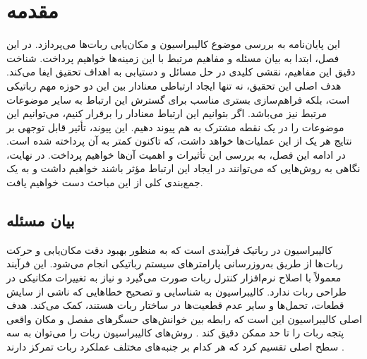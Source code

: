 
\chapter{مقدمه}

این پایان‌نامه به بررسی موضوع کالیبراسیون و مکان‌یابی ربات‌ها می‌پردازد. در این فصل، ابتدا به بیان مسئله و مفاهیم مرتبط با این زمینه‌ها خواهیم پرداخت. شناخت دقیق این مفاهیم، نقشی کلیدی در حل مسائل و دستیابی به اهداف تحقیق ایفا می‌کند. هدف اصلی این تحقیق، نه تنها ایجاد ارتباطی معنادار بین این دو حوزه مهم رباتیکی است، بلکه فراهم‌سازی بستری مناسب برای گسترش این ارتباط به سایر موضوعات مرتبط نیز می‌باشد. اگر بتوانیم این ارتباط معنادار را برقرار کنیم، می‌توانیم این موضوعات را در یک نقطه مشترک به هم پیوند دهیم. این پیوند، تأثیر قابل توجهی بر نتایج هر یک از این عملیات‌ها خواهد داشت، که تاکنون کمتر به آن پرداخته شده است. در ادامه این فصل، به بررسی این تأثیرات و اهمیت آن‌ها خواهیم پرداخت. در نهایت، نگاهی به روش‌هایی که می‌توانند در ایجاد این ارتباط مؤثر باشند خواهیم داشت و به یک جمع‌بندی کلی از این مباحث دست خواهیم یافت.


\section{بیان مسئله}
کالیبراسیون در رباتیک فرآیندی است که به منظور بهبود دقت مکان‌یابی و حرکت ربات‌ها از طریق به‌روزرسانی پارامترهای سیستم رباتیکی انجام می‌شود. این فرآیند معمولاً با اصلاح نرم‌افزار کنترل ربات صورت می‌گیرد و نیاز به تغییرات مکانیکی در طراحی ربات ندارد. کالیبراسیون به شناسایی و تصحیح خطاهایی که ناشی از سایش قطعات، تحمل‌ها و سایر عدم قطعیت‌ها در ساختار ربات هستند، کمک می‌کند. هدف اصلی کالیبراسیون این است که رابطه بین خوانش‌های حسگرهای مفصل و مکان واقعی پتجه ربات را تا حد ممکن دقیق کند 
\cite{roth1987overview}.
روش‌های کالیبراسیون ربات را می‌توان به سه سطح اصلی تقسیم کرد که هر کدام بر جنبه‌های مختلف عملکرد ربات تمرکز دارند
\cite{elatta2004overview, roth1987overview}.

